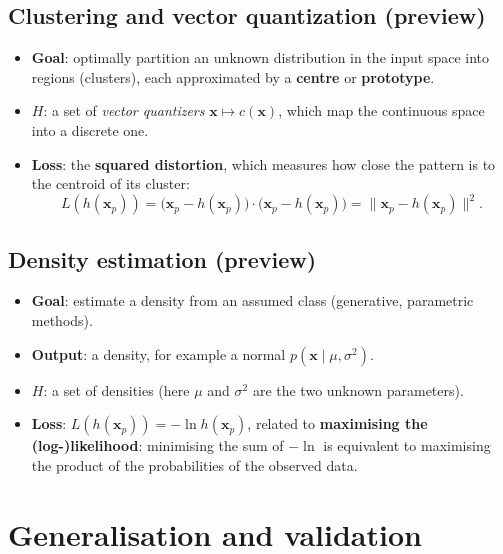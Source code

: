 \subsection{Clustering and vector quantization
(preview)}\label{clustering-e-vector-quantization-anticipazione}

\begin{itemize}
\tightlist
\item
  \textbf{Goal}: optimally partition an unknown distribution in the
  input space into regions (clusters), each approximated by a
  \textbf{centre} or \textbf{prototype}.
\item
  \textbf{\(H\)}: a set of \emph{vector quantizers}
  \(\mathbf{x} \mapsto c(\mathbf{x})\), which map the continuous space
  into a discrete one.
\item
  \textbf{Loss}: the \textbf{squared distortion}, which measures how
  close the pattern is to the centroid of its cluster: \[
  L(h(\mathbf{x}_p)) = \big(\mathbf{x}_p - h(\mathbf{x}_p)\big) \cdot \big(\mathbf{x}_p - h(\mathbf{x}_p)\big) = \|\mathbf{x}_p - h(\mathbf{x}_p)\|^2.
  \]
\end{itemize}

\subsection{Density estimation
(preview)}\label{stima-di-densituxe0-anticipazione}

\begin{itemize}
\tightlist
\item
  \textbf{Goal}: estimate a density from an assumed class (generative,
  parametric methods).
\item
  \textbf{Output}: a density, for example a normal
  \(p(\mathbf{x} \mid \mu, \sigma^2)\).
\item
  \textbf{\(H\)}: a set of densities (here \(\mu\) and \(\sigma^2\) are
  the two unknown parameters).
\item
  \textbf{Loss}: \(L(h(\mathbf{x}_p)) = -\ln h(\mathbf{x}_p)\), related
  to \textbf{maximising the (log-)likelihood}: minimising the sum of
  \(-\ln\) is equivalent to maximising the product of the probabilities
  of the observed data.
\end{itemize}

\section{Generalisation and
validation}\label{generalizzazione-e-validazione}

